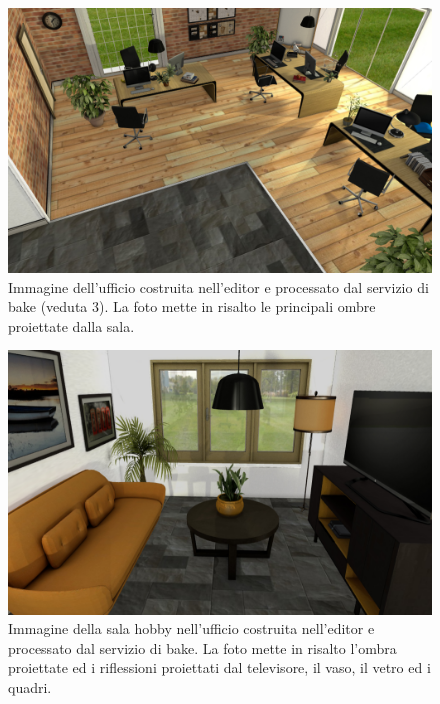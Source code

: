 \begin{figure}[htb]
 \centering
 \includegraphics[width=1\linewidth]{images/chapter_prove_sperimentali/scena_office_vista4.png}\hfill
 \caption[Ambiente virtuale: Ufficio, veduta 3]{Immagine dell'ufficio costruita nell'editor e processato dal servizio di bake (veduta 3). La foto mette in risalto le principali ombre proiettate dalla sala.}
 \label{fig:prove_sperimentali_qualita_visiva_ufficio_3}
\end{figure}
\begin{figure}[htb]
 \centering
 \includegraphics[width=1\linewidth]{images/chapter_prove_sperimentali/scena_office_hobby.png}\hfill
 \caption[Ambiente virtuale: Ufficio sala hobby]{Immagine della sala hobby nell'ufficio costruita nell'editor e processato dal servizio di bake. La foto mette in risalto l'ombra proiettate ed i riflessioni proiettati dal televisore, il vaso, il vetro ed i quadri.}
 \label{fig:prove_sperimentali_qualita_visiva_ufficio_hobby}
\end{figure}